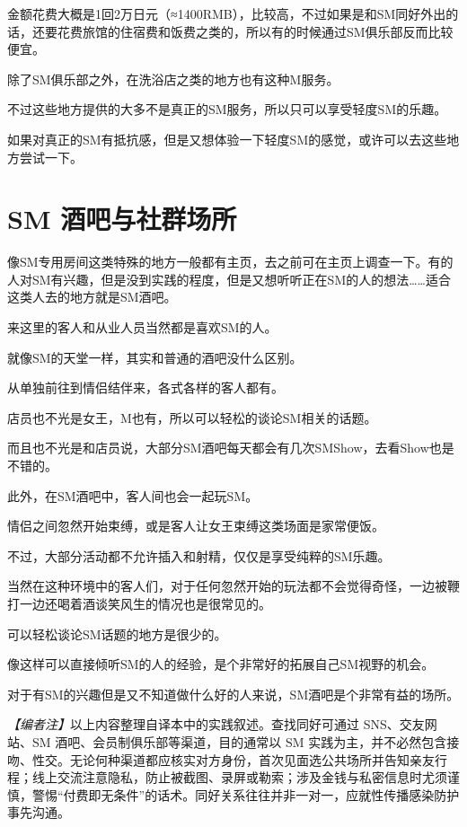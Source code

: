 \documentclass[12pt,UTF8]{ctexbook}
\begin{document}
金额花费大概是1回2万日元（≈1400RMB），比较高，不过如果是和SM同好外出的话，还要花费旅馆的住宿费和饭费之类的，所以有的时候通过SM俱乐部反而比较便宜。

除了SM俱乐部之外，在洗浴店之类的地方也有这种M服务。

不过这些地方提供的大多不是真正的SM服务，所以只可以享受轻度SM的乐趣。

如果对真正的SM有抵抗感，但是又想体验一下轻度SM的感觉，或许可以去这些地方尝试一下。

\section{SM 酒吧与社群场所}

像SM专用房间这类特殊的地方一般都有主页，去之前可在主页上调查一下。有的人对SM有兴趣，但是没到实践的程度，但是又想听听正在SM的人的想法……适合这类人去的地方就是SM酒吧。

来这里的客人和从业人员当然都是喜欢SM的人。

就像SM的天堂一样，其实和普通的酒吧没什么区别。

从单独前往到情侣结伴来，各式各样的客人都有。

店员也不光是女王，M也有，所以可以轻松的谈论SM相关的话题。

而且也不光是和店员说，大部分SM酒吧每天都会有几次SMShow，去看Show也是不错的。

此外，在SM酒吧中，客人间也会一起玩SM。

情侣之间忽然开始束缚，或是客人让女王束缚这类场面是家常便饭。

不过，大部分活动都不允许插入和射精，仅仅是享受纯粹的SM乐趣。

当然在这种环境中的客人们，对于任何忽然开始的玩法都不会觉得奇怪，一边被鞭打一边还喝着酒谈笑风生的情况也是很常见的。

可以轻松谈论SM话题的地方是很少的。

像这样可以直接倾听SM的人的经验，是个非常好的拓展自己SM视野的机会。

对于有SM的兴趣但是又不知道做什么好的人来说，SM酒吧是个非常有益的场所。

\noindent\textit{【编者注】}以上内容整理自译本中的实践叙述。查找同好可通过 SNS、交友网站、SM 酒吧、会员制俱乐部等渠道，目的通常以 SM 实践为主，并不必然包含接吻、性交。无论何种渠道都应核实对方身份，首次见面选公共场所并告知亲友行程；线上交流注意隐私，防止被截图、录屏或勒索；涉及金钱与私密信息时尤须谨慎，警惕“付费即无条件”的话术。同好关系往往并非一对一，应就性传播感染防护事先沟通。
\end{document}
